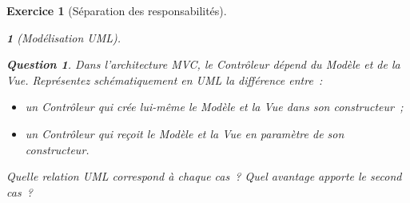 \documentclass{article}
\theoremstyle{exostyle}
\newtheorem{exo}{Exercice}
\theoremstyle{partiestyle}
\newtheorem{partie}{}[exo]
\theoremstyle{questionstyle}
\newtheorem{questionpartie}{Question}[partie]
\begin{document}
\begin{exo}[Séparation des responsabilités]
\begin{partie}[Modélisation UML]
        \begin{questionpartie}
            Dans l'architecture MVC, le Contrôleur dépend du Modèle et de la Vue. Représentez schématiquement en UML la différence entre~:
            \begin{itemize}
                \item un Contrôleur qui \textit{crée} lui-même le Modèle et la Vue dans son constructeur~;
                \item un Contrôleur qui \textit{reçoit} le Modèle et la Vue en paramètre de son constructeur.
            \end{itemize}
            Quelle relation UML correspond à chaque cas~? Quel avantage apporte le second cas~?
        \end{questionpartie}

    \end{partie}
\end{exo}
\end{document}
